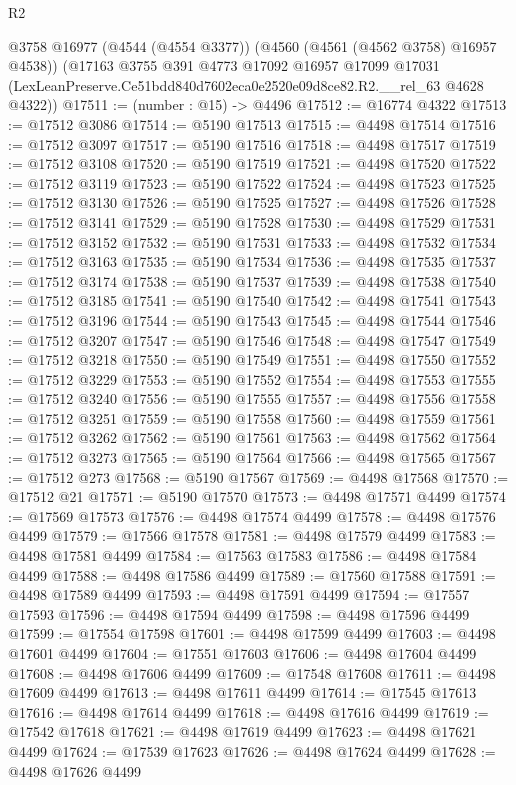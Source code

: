 \begin{lexlean}{R2}
\begin{coremodule}
    @3758
    @16977
    (@4544 (@4554 @3377))
    (@4560 (@4561 (@4562 @3758) @16957 @4538))
    (@17163
      @3755
      @391
      @4773
      @17092
      @16957
      @17099
      @17031
      (LexLeanPreserve.Ce51bdd840d7602eca0e2520e09d8ce82.R2.__rel_63 @4628 @4322))
@17511 := (number : @15) -> @4496
@17512 := @16774 @4322
@17513 := @17512 @3086
@17514 := @5190 @17513
@17515 := @4498 @17514
@17516 := @17512 @3097
@17517 := @5190 @17516
@17518 := @4498 @17517
@17519 := @17512 @3108
@17520 := @5190 @17519
@17521 := @4498 @17520
@17522 := @17512 @3119
@17523 := @5190 @17522
@17524 := @4498 @17523
@17525 := @17512 @3130
@17526 := @5190 @17525
@17527 := @4498 @17526
@17528 := @17512 @3141
@17529 := @5190 @17528
@17530 := @4498 @17529
@17531 := @17512 @3152
@17532 := @5190 @17531
@17533 := @4498 @17532
@17534 := @17512 @3163
@17535 := @5190 @17534
@17536 := @4498 @17535
@17537 := @17512 @3174
@17538 := @5190 @17537
@17539 := @4498 @17538
@17540 := @17512 @3185
@17541 := @5190 @17540
@17542 := @4498 @17541
@17543 := @17512 @3196
@17544 := @5190 @17543
@17545 := @4498 @17544
@17546 := @17512 @3207
@17547 := @5190 @17546
@17548 := @4498 @17547
@17549 := @17512 @3218
@17550 := @5190 @17549
@17551 := @4498 @17550
@17552 := @17512 @3229
@17553 := @5190 @17552
@17554 := @4498 @17553
@17555 := @17512 @3240
@17556 := @5190 @17555
@17557 := @4498 @17556
@17558 := @17512 @3251
@17559 := @5190 @17558
@17560 := @4498 @17559
@17561 := @17512 @3262
@17562 := @5190 @17561
@17563 := @4498 @17562
@17564 := @17512 @3273
@17565 := @5190 @17564
@17566 := @4498 @17565
@17567 := @17512 @273
@17568 := @5190 @17567
@17569 := @4498 @17568
@17570 := @17512 @21
@17571 := @5190 @17570
@17573 := @4498 @17571 @4499
@17574 := @17569 @17573
@17576 := @4498 @17574 @4499
@17578 := @4498 @17576 @4499
@17579 := @17566 @17578
@17581 := @4498 @17579 @4499
@17583 := @4498 @17581 @4499
@17584 := @17563 @17583
@17586 := @4498 @17584 @4499
@17588 := @4498 @17586 @4499
@17589 := @17560 @17588
@17591 := @4498 @17589 @4499
@17593 := @4498 @17591 @4499
@17594 := @17557 @17593
@17596 := @4498 @17594 @4499
@17598 := @4498 @17596 @4499
@17599 := @17554 @17598
@17601 := @4498 @17599 @4499
@17603 := @4498 @17601 @4499
@17604 := @17551 @17603
@17606 := @4498 @17604 @4499
@17608 := @4498 @17606 @4499
@17609 := @17548 @17608
@17611 := @4498 @17609 @4499
@17613 := @4498 @17611 @4499
@17614 := @17545 @17613
@17616 := @4498 @17614 @4499
@17618 := @4498 @17616 @4499
@17619 := @17542 @17618
@17621 := @4498 @17619 @4499
@17623 := @4498 @17621 @4499
@17624 := @17539 @17623
@17626 := @4498 @17624 @4499
@17628 := @4498 @17626 @4499

\end{coremodule}
\end{lexlean}
